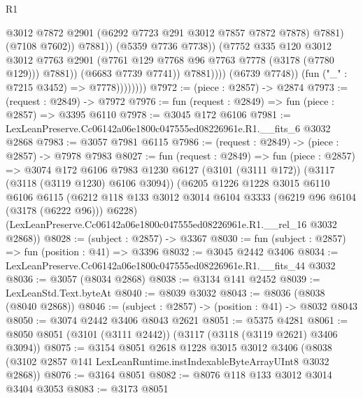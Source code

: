 \begin{lexlean}{R1}
\begin{coremodule}
                                          @3012
                                          @7872
                                          @2901
                                          (@6292 @7723 @291 @3012 @7857 @7872 @7878)
                                          @7881)
                                        (@7108 @7602))
                                      @7881))
                                  (@5359 @7736 @7738))
                                (@7752
                                  @335
                                  @120
                                  @3012
                                  @3012
                                  @7763
                                  @2901
                                  (@7761 @129 @7768 @96 @7763 @7778 (@3178 (@7780 @129)))
                                  @7881))
                              (@6683 @7739 @7741))
                            @7881))))
                    (@6739 @7748))
                  (fun ("_" : @7215 @3452) => @7778))))))))
@7972 := (piece : @2857) -> @2874
@7973 := (request : @2849) -> @7972
@7976 := fun (request : @2849) => fun (piece : @2857) => @3395 @6110
@7978 := @3045 @172 @6106
@7981 := LexLeanPreserve.Cc06142a06e1800c047555ed08226961e.R1.__fits_6 @3032 @2868
@7983 := @3057 @7981 @6115
@7986 := (request : @2849) -> (piece : @2857) -> @7978 @7983
@8027 := fun (request : @2849) =>
  fun (piece : @2857) =>
  @3074
    @172
    @6106
    @7983
    @1230
    @6127
    (@3101 (@3111 @172))
    (@3117 (@3118 (@3119 @1230) @6106 @3094))
    (@6205
      @1226
      @1228
      @3015
      @6110
      @6106
      @6115
      (@6212 @118 @133 @3012 @3014 @6104 @3333 (@6219 @96 @6104 (@3178 (@6222 @96))) @6228)
      (LexLeanPreserve.Cc06142a06e1800c047555ed08226961e.R1.__rel_16 @3032 @2868))
@8028 := (subject : @2857) -> @3367
@8030 := fun (subject : @2857) => fun (position : @41) => @3396
@8032 := @3045 @2442 @3406
@8034 := LexLeanPreserve.Cc06142a06e1800c047555ed08226961e.R1.__fits_44 @3032
@8036 := @3057 (@8034 @2868)
@8038 := @3134 @141 @2452
@8039 := LexLeanStd.Text.byteAt
@8040 := @8039 @3032
@8043 := @8036 (@8038 (@8040 @2868))
@8046 := (subject : @2857) -> (position : @41) -> @8032 @8043
@8050 := @3074 @2442 @3406 @8043 @2621
@8051 := @5375 @4281
@8061 := @8050 @8051 (@3101 (@3111 @2442)) (@3117 (@3118 (@3119 @2621) @3406 @3094))
@8075 := @3154
    @8051
    @2618
    @1228
    @3015
    @3012
    @3406
    (@8038 (@3102 @2857 @141 LexLeanRuntime.instIndexableByteArrayUInt8 @3032 @2868))
@8076 := @3164 @8051
@8082 := @8076 @118 @133 @3012 @3014 @3404 @3053
@8083 := @3173 @8051

\end{coremodule}
\end{lexlean}
